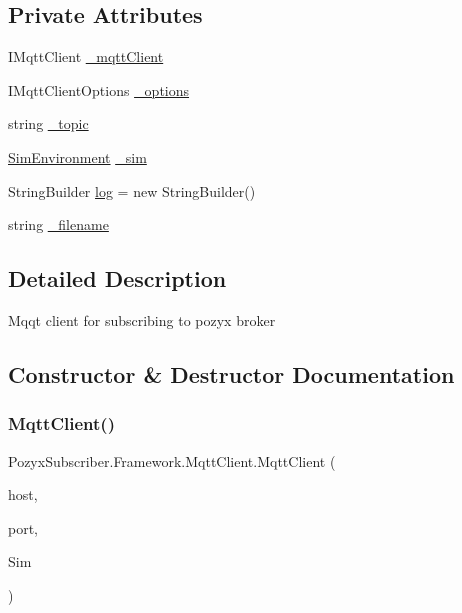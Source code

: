 \subsection*{Private Attributes}
\begin{DoxyCompactItemize}
\item 
I\+Mqtt\+Client \hyperlink{class_pozyx_subscriber_1_1_framework_1_1_mqtt_client_a87eef1b4acc1a34131cba51200b1d769}{\+\_\+mqtt\+Client}
\item 
I\+Mqtt\+Client\+Options \hyperlink{class_pozyx_subscriber_1_1_framework_1_1_mqtt_client_a02914fcd8ac56b10a6cd5c29a4a6b64e}{\+\_\+options}
\item 
string \hyperlink{class_pozyx_subscriber_1_1_framework_1_1_mqtt_client_a87701d3f45a0c6149f9a7305144713f8}{\+\_\+topic}
\item 
\hyperlink{class_pozyx_subscriber_1_1_sim_environment}{Sim\+Environment} \hyperlink{class_pozyx_subscriber_1_1_framework_1_1_mqtt_client_ab65cd6844648eb75a68ffe881f80beea}{\+\_\+sim}
\item 
String\+Builder \hyperlink{class_pozyx_subscriber_1_1_framework_1_1_mqtt_client_a5ed77cbca2ee86d73a18d0dedb1bbe99}{log} = new String\+Builder()
\item 
string \hyperlink{class_pozyx_subscriber_1_1_framework_1_1_mqtt_client_ae52e36480c57296f8c88230dac699a95}{\+\_\+filename}
\end{DoxyCompactItemize}


\subsection{Detailed Description}
Mqqt client for subscribing to pozyx broker 



\subsection{Constructor \& Destructor Documentation}
\mbox{\label{class_pozyx_subscriber_1_1_framework_1_1_mqtt_client_ad2d247e2046c2a43f823e77a94802545}} 
\subsubsection{\texorpdfstring{Mqtt\+Client()}{MqttClient()}\hspace{0.1cm}{\footnotesize\ttfamily [1/2]}}
{\footnotesize\ttfamily Pozyx\+Subscriber.\+Framework.\+Mqtt\+Client.\+Mqtt\+Client (\begin{DoxyParamCaption}\item[{string}]{host,  }\item[{int}]{port,  }\item[{\hyperlink{class_pozyx_subscriber_1_1_sim_environment}{Sim\+Environment}}]{Sim }\end{DoxyParamCaption})}



